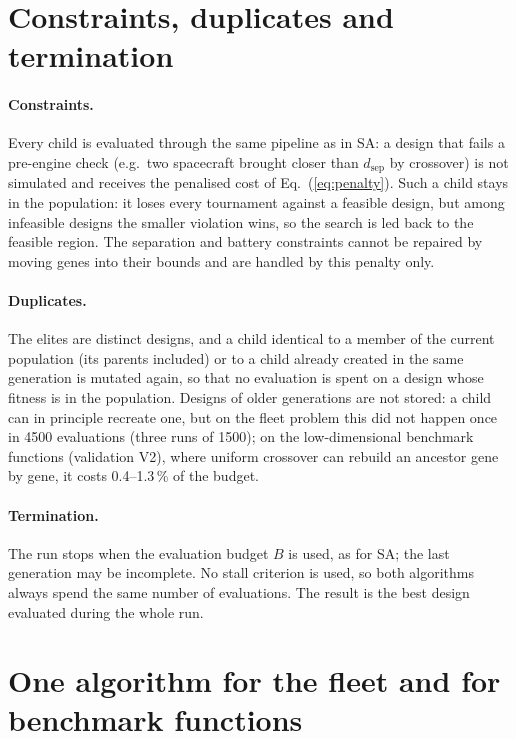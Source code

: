 \section{Constraints, duplicates and termination}
\label{sec:ga-other}

\paragraph{Constraints.} Every child is evaluated through the same pipeline as in \ac{SA}: a
design that fails a pre-engine check (e.g.\ two spacecraft brought closer than $d_{\mathrm{sep}}$
by crossover) is not simulated and receives the penalised cost of Eq.~(\ref{eq:penalty}). Such a
child stays in the population: it loses every tournament against a feasible design, but among
infeasible designs the smaller violation wins, so the search is led back to the feasible region.
The separation and battery constraints cannot be repaired by moving genes into their bounds and are
handled by this penalty only.

\paragraph{Duplicates.} The elites are distinct designs, and a child identical to a member of the
current population (its parents included) or to a child already created in the same generation is
mutated again, so that no evaluation is spent on a design whose fitness is in the population. Designs
of older generations are not stored: a child can in principle recreate one, but on the fleet problem
this did not happen once in 4500 evaluations (three runs of 1500); on the low-dimensional benchmark
functions (validation V2), where uniform crossover can rebuild an ancestor gene by gene, it costs
0.4--1.3\,\% of the budget.

\paragraph{Termination.} The run stops when the evaluation budget $B$ is used, as for \ac{SA}; the
last generation may be incomplete. No stall criterion is used, so both algorithms always spend the
same number of evaluations. The result is the best design evaluated during the whole run.

\section{One algorithm for the fleet and for benchmark functions}
\label{sec:ga-generic}

